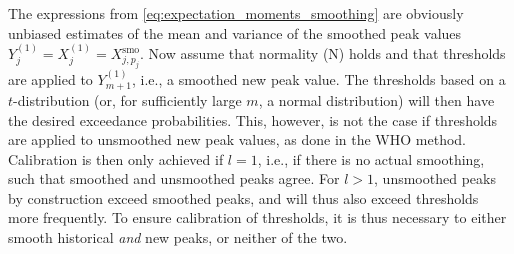 \documentclass[12pt]{article}
\begin{document}
The expressions from \eqref{eq:expectation_moments_smoothing} are obviously unbiased estimates of the mean and variance of the smoothed peak values  $Y_j^{(1)} =  X_j^{(1)} = X^{\text{smo}}_{j, p_j}$. Now assume that normality (N) holds and that thresholds are applied to $Y_{m + 1}^{(1)}$, i.e., a smoothed new peak value. The thresholds based on a $t$-distribution (or, for sufficiently large $m$, a normal distribution) will then have the desired exceedance probabilities. This, however, is not the case if thresholds are applied to unsmoothed new peak values, as done in the WHO method. Calibration is then only achieved if $l = 1$, i.e., if there is no actual smoothing, such that smoothed and unsmoothed peaks agree. For $l > 1$, unsmoothed peaks by construction exceed smoothed peaks, and will thus also exceed thresholds more frequently. %
To ensure calibration of thresholds, it is thus necessary to either smooth historical \textit{and} new peaks, or neither of the two. %

\end{document}
